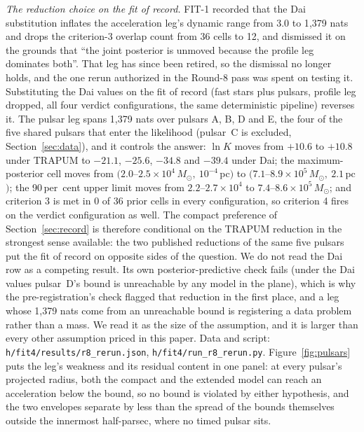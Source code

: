 \documentclass[11pt]{article}
\newcommand{\msun}{\ensuremath{M_\odot}}
\newcommand{\lnK}{\ensuremath{\ln K}}
\begin{document}
\emph{The reduction choice on the fit of record.} FIT-1 recorded that the Dai substitution inflates the acceleration leg's dynamic range from 3.0 to 1{,}379 nats and drops the criterion-3 overlap count from 36 cells to 12, and dismissed it on the grounds that ``the joint posterior is unmoved because the profile leg dominates both''. That leg has since been retired, so the dismissal no longer holds, and the one rerun authorized in the Round-8 pass was spent on testing it. Substituting the Dai values on the fit of record (fast stars plus pulsars, profile leg dropped, all four verdict configurations, the same deterministic pipeline) reverses it. The pulsar leg spans 1{,}379 nats over pulsars A, B, D and E, the four of the five shared pulsars that enter the likelihood (pulsar~C is excluded, Section~\ref{sec:data}), and it controls the answer: $\lnK$ moves from $+10.6$ to $+10.8$ under TRAPUM to $-21.1$, $-25.6$, $-34.8$ and $-39.4$ under Dai; the maximum-posterior cell moves from $(2.0$--$2.5\times10^{4}\,\msun,\ 10^{-4}$\,pc$)$ to $(7.1$--$8.9\times10^{5}\,\msun,\ 2.1$\,pc$)$; the 90\,per~cent upper limit moves from $2.2$--$2.7\times10^{4}$ to $7.4$--$8.6\times10^{5}\,\msun$; and criterion 3 is met in 0 of 36 prior cells in every configuration, so criterion 4 fires on the verdict configuration as well. The compact preference of Section~\ref{sec:record} is therefore conditional on the TRAPUM reduction in the strongest sense available: the two published reductions of the same five pulsars put the fit of record on opposite sides of the question. We do not read the Dai row as a competing result. Its own posterior-predictive check fails (under the Dai values pulsar~D's bound is unreachable by any model in the plane), which is why the pre-registration's check flagged that reduction in the first place, and a leg whose 1{,}379 nats come from an unreachable bound is registering a data problem rather than a mass. We read it as the size of the assumption, and it is larger than every other assumption priced in this paper. Data and script: \texttt{h/fit4/results/r8\_rerun.json}, \texttt{h/fit4/run\_r8\_rerun.py}. Figure~\ref{fig:pulsars} puts the leg's weakness and its residual content in one panel: at every pulsar's projected radius, both the compact and the extended model can reach an acceleration below the bound, so no bound is violated by either hypothesis, and the two envelopes separate by less than the spread of the bounds themselves outside the innermost half-parsec, where no timed pulsar sits.
\end{document}
